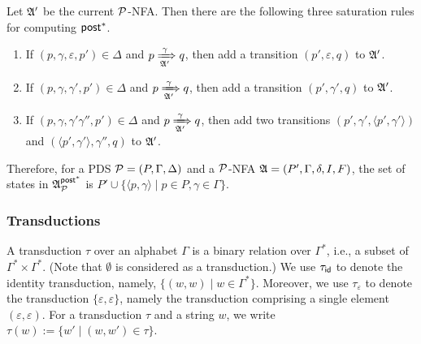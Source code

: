 Let ${\mathfrak{A} }'$ be the current ${\mathcal{P} }$-NFA. Then there are the following three saturation rules for computing ${\mathsf{post} }^*$. 

\smallskip
\fbox
{
\begin{minipage}{0.9\textwidth}
\begin{enumerate}
    \item If $(p, \gamma, \varepsilon, p') \in \Delta$ and $p \xRightarrow[{\mathfrak{A} }']{\gamma} q$, then add a transition $(p', \varepsilon, q)$ to ${\mathfrak{A} }'$. 
%
    \item If $(p, \gamma, \gamma', p') \in \Delta$ and $p \xRightarrow[{\mathfrak{A} }']{\gamma} q$, then add a transition $(p', \gamma', q)$ to ${\mathfrak{A} }'$. 
%
    \item If $(p, \gamma, \gamma' \gamma'', p') \in \Delta$ and $p \xRightarrow[{\mathfrak{A} }']{\gamma } q$, then add two transitions $(p', \gamma', \langle p', \gamma'\rangle)$ and $(\langle p', \gamma' \rangle, \gamma'', q)$ to ${\mathfrak{A} }'$.     
\end{enumerate}
\end{minipage}
}

\smallskip

Therefore, for a PDS ${\mathcal{P} }=(P,\Gamma,\Delta)$ and a ${\mathcal{P} }$-NFA ${\mathfrak{A} } = (P', \Gamma, \delta, I, F)$, the set of states in ${\mathfrak{A} }^{{\mathsf{post} }^*}_{\mathcal{P} }$ is $P' \cup \{\langle p, \gamma \rangle \mid p \in P, \gamma \in \Gamma \}$.


\subsubsection{Transductions}
A transduction $\tau$ over an alphabet $\Gamma$ is a binary relation over $\Gamma^*$, i.e., a subset of $\Gamma^* \times \Gamma^*$. (Note that $\emptyset$ is considered as a transduction.)
We use $\tau_{\mathsf{id}}$ to denote the identity transduction, namely,  $\{(w,w) \mid w \in \Gamma^*\}$. 
Moreover, we use $\tau_\varepsilon$ to denote the transduction $\{\varepsilon, \varepsilon\}$, namely the transduction comprising a single element $(\varepsilon, \varepsilon)$.
For a transduction $\tau$ and a string $w$, we write $\tau(w):= \{w' \mid (w, w') \in \tau \}$.


